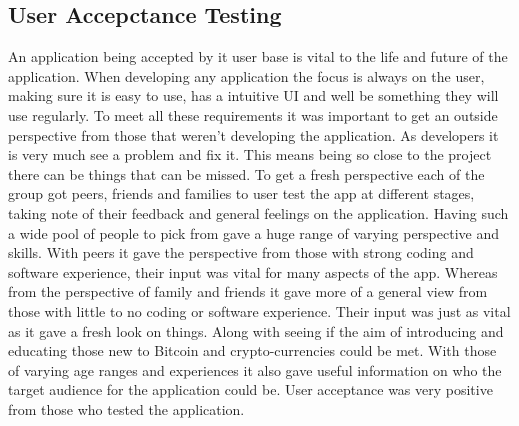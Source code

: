 \subsection{User Accepctance Testing}
An application being accepted by it user base is vital to the life and future of the application. When developing any application the focus is always on the user, making sure it is easy to use, has a intuitive UI and well be something they will use regularly. To meet all these requirements it was important to get an outside perspective from those that weren't developing the application. As developers it is very much see  a problem and fix it. This means being so close to the project there can be things that can be missed. To get a fresh perspective each of the group got peers, friends and families to user test the app at different stages, taking note of their feedback and general feelings on the application. 
Having such a wide pool of people to pick from gave a huge range of varying perspective and skills. With peers it gave the perspective from those with strong coding and software experience, their input was vital for many aspects of the app. Whereas from the perspective of family and friends it gave more of a general view from those with little to no coding or software experience. Their input was just as vital as it gave a fresh look on things. Along with seeing if the aim of introducing and educating those new to Bitcoin and crypto-currencies could be met. With those of varying age ranges and experiences it also gave useful information on who the target audience for the application could be. User acceptance was very positive from those who tested the application.

